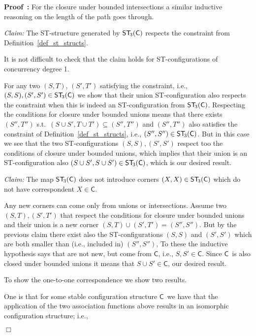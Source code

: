 \documentclass[submission,copyright,creativecommons]{eptcs}
\newenvironment{proof}[1][\!\!\,]{\vspace{1ex}\noindent\textbf{Proof #1: }}{\hfill$\Box$\vspace{2ex}}
\newcounter{case}
\newcommand\C{\ensuremath{\mathsf{C}}}
\newcommand\cintostThird{\ensuremath{\mathsf{ST}_{\hspace{-0.4ex}3}}}
\begin{document}
\begin{proof}
For the closure under bounded intersections a similar inductive reasoning on the length of the path goes through.


\vspace{1ex}
\noindent\textit{Claim:}\hspace{1ex} The ST-structure generated by $\cintostThird(\C)$ respects the constraint from Definition~\ref{def_st_structs}.

\vspace{1ex}
It is not difficult to check that the claim holds for ST-configurations of concurrency degree 1. 

For any two $(S,T)$, $(S',T')$ satisfying the constraint, i.e., $(S,S),(S',S')\in\cintostThird(\C)$ we show that their union ST-configuration also respects the constraint when this is indeed an ST-configuration from $\cintostThird(\C)$. 
Respecting the conditions for closure under bounded unions means that there exists $(S'',T'')$ s.t.\ $(S\cup S',T\cup T')\subseteq (S'',T'')$ and $(S'',T'')$ also satisfies the constraint of Definition~\ref{def_st_structs}, i.e., $(S'',S'')\in\cintostThird(\C)$. But in this case we see that the two ST-configurations $(S,S),(S',S')$ respect too the conditions of closure under bounded unions, which implies that their union is an ST-configuration also $(S\cup S',S\cup S')\in\cintostThird(\C)$, which is our desired result.


\vspace{1ex}
\noindent\textit{Claim:}\hspace{1ex} The map $\cintostThird(\C)$ does not introduce corners $(X,X)\in\cintostThird(\C)$ which do not have correspondent $X\in\C$.
\vspace{0.5ex}

Any new corners can come only from unions or intersections. Assume two $(S,T),(S',T')$ that respect the conditions for closure under bounded unions and their union is a new corner $(S,T)\cup(S',T')=(S'',S'')$. But by the previous claim there exist also the ST-configurations $(S,S)$ and $(S',S')$ which are both smaller than (i.e., included in) $(S'',S'')$, To these the inductive hypothesis says that are not new, but come from \C, i.e., $S,S'\in\C$. Since \C\ is also closed under bounded unions it means that $S\cup S'\in\C$, our desired result.

\vspace{1ex}
To show the one-to-one correspondence we show two results.

One is that for some stable configuration structure \C\ we have that the application of the two association functions above results in an isomorphic configuration structure; i.e., 


\end{proof}
\end{document}
